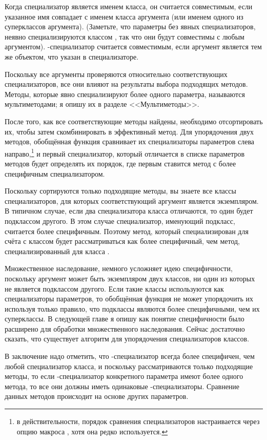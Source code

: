 Когда специализатор является именем класса, он считается совместимым, если указанное имя
совпадает с именем класса аргумента (или именем одного из суперклассов аргумента).
(Заметьте, что параметры без явных специализаторов, неявно специализируются классом
, так что они будут совместимы с любым аргументом).  -специализатор
считается совместимым, если аргумент является тем же объектом, что указан в
специализаторе.

Поскольку все аргументы проверяются относительно соответствующих специализаторов, все они
влияют на результаты выбора подходящих методов.  Методы, которые явно специализируют более
одного параметра, называются мультиметодами; я опишу их в разделе <<Мультиметоды>>.

После того, как все соответствующие методы найдены, необходимо отсортировать их, чтобы
затем скомбинировать в эффективный метод.  Для упорядочения двух методов, обобщённая
функция сравнивает их специализаторы параметров слева направо,\footnote{в
  действительности, порядок сравнения специализаторов настраивается через опцию
   макроса , хотя она редко
  используется.} и первый специализатор, который отличается в списке параметров методов
будет определять их порядок, где первым ставится метод с более специфичным
специализатором.

Поскольку сортируются только подходящие методы, вы знаете все классы специализаторов, для
которых соответствующий аргумент является экземпляром.  В типичном случае, если два
специализатора класса отличаются, то один будет подклассом другого.  В этом случае
специализатор, именующий подкласс, считается более специфичным.  Поэтому метод, который
специализирован для счёта с классом  будет рассматриваться как
более специфичный, чем метод, специализированный для класса .

Множественное наследование, немного усложняет идею специфичности, поскольку аргумент может
быть экземпляром двух классов, ни один из которых не является подклассом другого.  Если
такие классы используются как специализаторы параметров, то обобщённая функция не может
упорядочить их используя только правило, что подклассы являются более специфичными, чем их
суперклассы.  В следующей главе я опишу как понятие специфичности было расширено для
обработки множественного наследования.  Сейчас достаточно сказать, что существует алгоритм
для упорядочения специализаторов классов.

В заключение надо отметить, что -специализатор всегда более специфичен, чем
любой специализатор класса, и поскольку рассматриваются только подходящие методы, то если
-специализатор конкретного параметра имеют более одного метода, то все они
должны иметь одинаковые -специализаторы.  Сравнение данных методов происходит на
основе других параметров.

